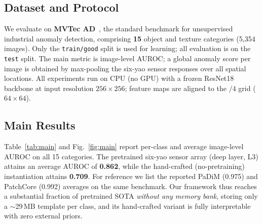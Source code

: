 \documentclass[preprint,12pt]{elsarticle}
\begin{document}
\subsection{Dataset and Protocol}
We evaluate on \textbf{MVTec AD}~\cite{bergmann2019mvtec}, the standard
benchmark for unsupervised industrial anomaly detection, comprising
\textbf{15} object and texture categories (5{,}354 images). Only the
\texttt{train/good} split is used for learning; all evaluation is on the
\texttt{test} split. The main metric is image-level AUROC; a global
anomaly score per image is obtained by max-pooling the six-yao
sensor responses over all spatial locations. All experiments run on CPU
(no GPU) with a frozen ResNet18 backbone at input resolution $256\times256$;
feature maps are aligned to the $/4$ grid ($64\times64$).

\subsection{Main Results}
Table~\ref{tab:main} and Fig.~\ref{fig:main} report per-class and average
image-level AUROC on all 15 categories. The pretrained six-yao sensor array (deep layer, L3)
attains an average AUROC of \textbf{0.862}, while the hand-crafted
(no-pretraining) instantiation attains \textbf{0.709}. For reference we
list the reported PaDiM (0.975) and PatchCore (0.992) averages on the same
benchmark. Our framework thus reaches a substantial fraction of
pretrained SOTA \emph{without any memory bank}, storing only a
$\sim$29\,MB template per class, and its hand-crafted variant is fully
interpretable with zero external priors.
\end{document}
